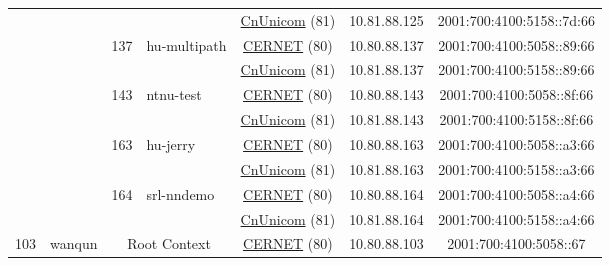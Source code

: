 \begin{small}
\begin{center}
\begin{longtable}{|c|c|c|c|c|c|c|c|}
  &  &  &  & \multicolumn{2}{|c|}{\tiny{\href{http://www.chinaunicom.com}{CnUnicom} (81)}} & \tiny{10.81.88.125} & \tiny{2001:700:4100:5158::7d:66} \\* \cline{3-3}\cline{4-4}\cline{5-5}\cline{6-6}\cline{7-7}\cline{8-8}
  &  & \multirow{2}{*}{\tiny{137}} & \multicolumn{1}{|l|}{\multirow{2}{*}{\tiny{hu-multipath}}} & \multicolumn{2}{|c|}{\tiny{\href{http://www.cernet.edu.cn}{CERNET} (80)}} & \tiny{10.80.88.137} & \tiny{2001:700:4100:5058::89:66} \\* \cline{5-5}\cline{6-6}\cline{7-7}\cline{8-8}
  &  &  &  & \multicolumn{2}{|c|}{\tiny{\href{http://www.chinaunicom.com}{CnUnicom} (81)}} & \tiny{10.81.88.137} & \tiny{2001:700:4100:5158::89:66} \\* \cline{3-3}\cline{4-4}\cline{5-5}\cline{6-6}\cline{7-7}\cline{8-8}
  &  & \multirow{2}{*}{\tiny{143}} & \multicolumn{1}{|l|}{\multirow{2}{*}{\tiny{ntnu-test}}} & \multicolumn{2}{|c|}{\tiny{\href{http://www.cernet.edu.cn}{CERNET} (80)}} & \tiny{10.80.88.143} & \tiny{2001:700:4100:5058::8f:66} \\* \cline{5-5}\cline{6-6}\cline{7-7}\cline{8-8}
  &  &  &  & \multicolumn{2}{|c|}{\tiny{\href{http://www.chinaunicom.com}{CnUnicom} (81)}} & \tiny{10.81.88.143} & \tiny{2001:700:4100:5158::8f:66} \\* \cline{3-3}\cline{4-4}\cline{5-5}\cline{6-6}\cline{7-7}\cline{8-8}
  &  & \multirow{2}{*}{\tiny{163}} & \multicolumn{1}{|l|}{\multirow{2}{*}{\tiny{hu-jerry}}} & \multicolumn{2}{|c|}{\tiny{\href{http://www.cernet.edu.cn}{CERNET} (80)}} & \tiny{10.80.88.163} & \tiny{2001:700:4100:5058::a3:66} \\* \cline{5-5}\cline{6-6}\cline{7-7}\cline{8-8}
  &  &  &  & \multicolumn{2}{|c|}{\tiny{\href{http://www.chinaunicom.com}{CnUnicom} (81)}} & \tiny{10.81.88.163} & \tiny{2001:700:4100:5158::a3:66} \\* \cline{3-3}\cline{4-4}\cline{5-5}\cline{6-6}\cline{7-7}\cline{8-8}
  &  & \multirow{2}{*}{\tiny{164}} & \multicolumn{1}{|l|}{\multirow{2}{*}{\tiny{srl-nndemo}}} & \multicolumn{2}{|c|}{\tiny{\href{http://www.cernet.edu.cn}{CERNET} (80)}} & \tiny{10.80.88.164} & \tiny{2001:700:4100:5058::a4:66} \\* \cline{5-5}\cline{6-6}\cline{7-7}\cline{8-8}
  &  &  &  & \multicolumn{2}{|c|}{\tiny{\href{http://www.chinaunicom.com}{CnUnicom} (81)}} & \tiny{10.81.88.164} & \tiny{2001:700:4100:5158::a4:66} \\ \hline
 \multirow{16}{*}{\tiny{103}} & \multicolumn{1}{|l|}{\multirow{16}{*}{\tiny{wanqun}}} & \multicolumn{2}{|c|}{\multirow{2}{*}{\tiny{Root Context}}} & \multicolumn{2}{|c|}{\tiny{\href{http://www.cernet.edu.cn}{CERNET} (80)}} & \tiny{10.80.88.103} & \tiny{2001:700:4100:5058::67} \\* \cline{5-5}\cline{6-6}\cline{7-7}\cline{8-8}

\end{longtable}
\end{center}
\end{small}

